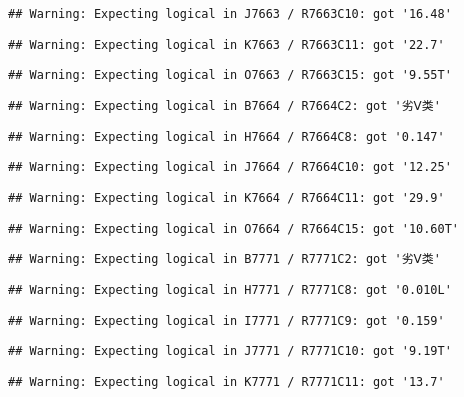 \documentclass[
]{article}
\begin{document}
\begin{verbatim}
## Warning: Expecting logical in J7663 / R7663C10: got '16.48'
\end{verbatim}

\begin{verbatim}
## Warning: Expecting logical in K7663 / R7663C11: got '22.7'
\end{verbatim}

\begin{verbatim}
## Warning: Expecting logical in O7663 / R7663C15: got '9.55T'
\end{verbatim}

\begin{verbatim}
## Warning: Expecting logical in B7664 / R7664C2: got '劣Ⅴ类'
\end{verbatim}

\begin{verbatim}
## Warning: Expecting logical in H7664 / R7664C8: got '0.147'
\end{verbatim}

\begin{verbatim}
## Warning: Expecting logical in J7664 / R7664C10: got '12.25'
\end{verbatim}

\begin{verbatim}
## Warning: Expecting logical in K7664 / R7664C11: got '29.9'
\end{verbatim}

\begin{verbatim}
## Warning: Expecting logical in O7664 / R7664C15: got '10.60T'
\end{verbatim}

\begin{verbatim}
## Warning: Expecting logical in B7771 / R7771C2: got '劣Ⅴ类'
\end{verbatim}

\begin{verbatim}
## Warning: Expecting logical in H7771 / R7771C8: got '0.010L'
\end{verbatim}

\begin{verbatim}
## Warning: Expecting logical in I7771 / R7771C9: got '0.159'
\end{verbatim}

\begin{verbatim}
## Warning: Expecting logical in J7771 / R7771C10: got '9.19T'
\end{verbatim}

\begin{verbatim}
## Warning: Expecting logical in K7771 / R7771C11: got '13.7'
\end{verbatim}
\end{document}

